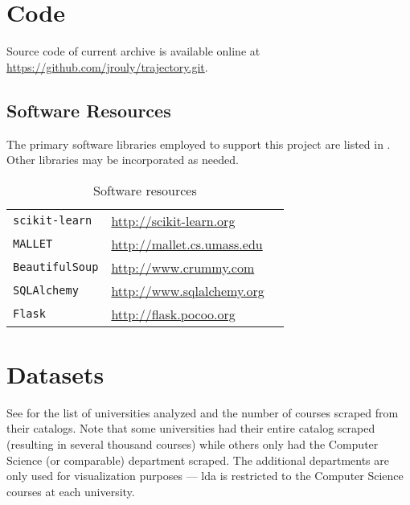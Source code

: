 

\section{Code}
\label{app:code}

Source code of current archive is available online at \url{https://github.com/jrouly/trajectory.git}.


\subsection{Software Resources}
\label{app:resources}


The primary software libraries employed to support this project are listed in . Other libraries may be incorporated as needed.

\begin{table}[ht]
\centering
\begin{tabular}{lll}
\toprule
\texttt{scikit-learn} & \url{http://scikit-learn.org} \\
\texttt{MALLET} & \url{http://mallet.cs.umass.edu} \\
\texttt{BeautifulSoup} & \url{http://www.crummy.com} \\
\texttt{SQLAlchemy} & \url{http://www.sqlalchemy.org} \\
\texttt{Flask} & \url{http://flask.pocoo.org} \\
\bottomrule
\end{tabular}
\caption{Software resources\label{table:software-resources}}
\end{table}


\section{Datasets}
\label{app:datasets}

See  for the list of universities analyzed and the number of courses scraped from their catalogs.
Note that some universities had their entire catalog scraped (resulting in several thousand courses) while others only had the Computer Science (or comparable) department scraped.
The additional departments are only used for visualization purposes --- \ac{lda} is restricted to the Computer Science courses at each university.

